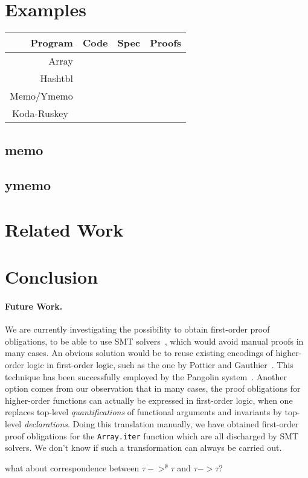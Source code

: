 \documentclass[a4paper]{llncs}
\begin{document}
% 

\section{Examples}

\begin{center}
    \begin{tabular}{ | r | r | r | r |}
    \hline
    Program & Code & Spec & Proofs \\ \hline
    Array &  &  &  \\
    Hashtbl & & &  \\ \hline
    Memo/Ymemo & & &  \\ \hline
    Koda-Ruskey~\cite{KanigFilliatre09wml} & & &  \\ \hline
    \end{tabular}
\end{center}

\subsection{memo}
\subsection{ymemo}

\section{Related Work}

\section{Conclusion}

\paragraph{Future Work.}

We are currently investigating the possibility to obtain first-order proof
obligations, to be able to use SMT solvers~\cite{RanTin-SMTLIB}, which would
avoid manual proofs in many cases. An obvious solution would be to reuse
existing encodings of higher-order logic in first-order logic, such as the one
by Pottier and Gauthier~\cite{pottier-gauthier-hosc}. This technique has been
successfully employed by the Pangolin system~\cite{regis-gianas-pottier-08}.
Another option comes from our observation that in many cases, the proof
obligations for higher-order functions can actually be expressed in
first-order logic, when one replaces top-level {\em quantifications} of
functional arguments and invariants by top-level {\em declarations}. Doing
this translation manually, we have obtained first-order proof
obligations for the {\tt Array.iter} function which are all discharged by
SMT solvers. We don't know if such a transformation can always be carried out.

what about correspondence between $τ ->^\emptyset τ$ and $τ -> τ$?


{}
\end{document}
